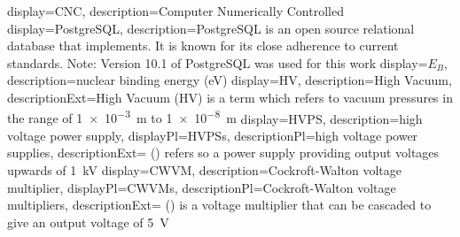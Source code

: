 {
    display={CNC},
    description={Computer Numerically Controlled}
}
{
    display={PostgreSQL},
    description={PostgreSQL is an open source relational database that implements. It is known for its close adherence to current standards. Note: Version 10.1 of PostgreSQL was used for this work}
}
{
    display={\ensuremath{E_{B}}},
    description={nuclear binding energy (\si{\electronvolt})}
}
{
    display={HV},
    description={High Vacuum},
    descriptionExt={High Vacuum (HV) is a term which refers to vacuum pressures in the range of \SI{1e-3}{\meter} to \SI{1e-8}{\meter}\cite{acc:13}}
}
{
    display={HVPS},
    description={high voltage power supply},
    displayPl={HVPSs},
    descriptionPl={high voltage power supplies},
    descriptionExt={ () refers so a power supply 
                    providing output voltages upwards of \SI{1}{\kilo\volt}}
}
{
    display={CWVM},
    description={Cockroft-Walton voltage multiplier},
    displayPl={CWVMs},
    descriptionPl={Cockroft-Walton voltage multipliers},
    descriptionExt={ () is a voltage multiplier that 
                    can be cascaded to give an output voltage of \SI{5}{\volt}}
}

